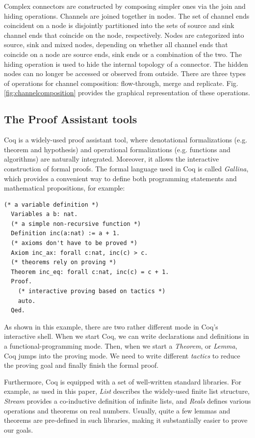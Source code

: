 \documentclass[3p,times]{elsarticle}
\begin{document}
Complex connectors are constructed by composing simpler ones via the join and hiding operations. Channels are joined together in nodes. The set of channel ends coincident on a node is disjointly partitioned into the sets of source and sink channel ends that coincide on the node, respectively. Nodes are categorized into source, sink and mixed nodes, depending on whether all channel ends that coincide on a node are source ends, sink ends or a combination of the two. The hiding operation is used to hide the internal topology of a connector. The hidden nodes can no longer be accessed or observed from outside. There are three types of operations for channel composition: flow-through, merge and replicate. Fig. \ref{fig:channelcomposition} provides the graphical representation of these operations.

\subsection{The Proof Assistant tools}

Coq\cite{huet1997coq} is a widely-used proof assistant tool, where denotational formalizations (e.g.
theorem and hypothesis) and operational formalizations (e.g. functions and algorithms) are naturally
integrated. Moreover, it allows the interactive construction of formal proofs.
The formal language used in Coq is called \emph{Gallina}, which provides a convenient way to define
both programming statements and mathematical propositions, for example:
\begin{lstlisting}[language=coq]
  (* a variable definition *)
  Variables a b: nat.
  (* a simple non-recursive function *)
  Definition inc(a:nat) := a + 1.
  (* axioms don't have to be proved *)
  Axiom inc_ax: forall c:nat, inc(c) > c.
  (* theorems rely on proving *)
  Theorem inc_eq: forall c:nat, inc(c) = c + 1.
  Proof.
    (* interactive proving based on tactics *)
    auto.
  Qed.
\end{lstlisting}

As shown in this example, there are two rather different mode in Coq's interactive shell. When
we start Coq, we can write declarations and definitions in a functional-programming mode. Then, when
we start a \emph{Theorem}, or \emph{Lemma}, Coq jumps into the proving mode. We need to write
different \emph{tactics} to reduce the proving goal and finally finish the formal proof.

Furthermore, Coq is equipped with a set of well-written standard libraries. For example, as used in
this paper, \emph{List} describes the widely-used finite list structure, \emph{Stream} provides a co-inductive
definition of infinite lists, and \emph{Reals} defines various operations and theorems on real
numbers. Usually, quite a few lemmas and theorems are pre-defined in such libraries, making it
substantially easier to prove our goals.
\end{document}
